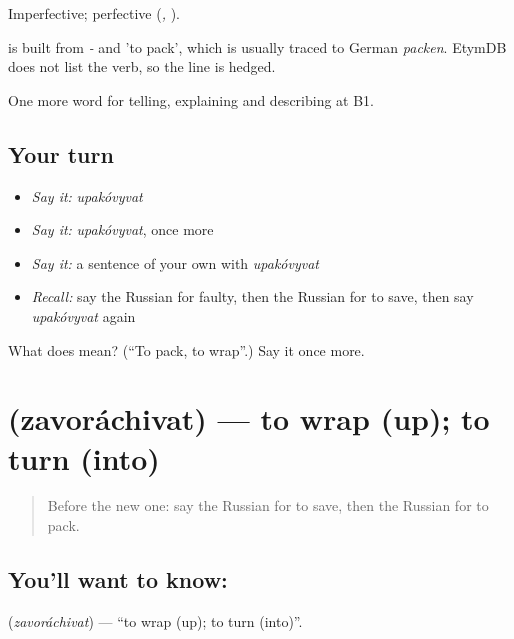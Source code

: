 Imperfective; perfective \emph{} (\emph{, }).

\begin{cousinweb}
\emph{} is built from \emph{-} and \emph{} 'to pack', which is usually traced to German \emph{packen}. EtymDB does not list the verb, so the line is hedged.
\end{cousinweb}

\begin{grammarlens}[title={What you've built}]
One more word for telling, explaining and describing at B1.
\end{grammarlens}

\subsection*{Your turn}
\begin{itemize}
\raggedright
  \item \emph{Say it:} \emph{upakóvyvat}
  \item \emph{Say it:} \emph{upakóvyvat}, once more
  \item \emph{Say it:} a sentence of your own with \emph{upakóvyvat}
  \item \emph{Recall:} say the Russian for faulty, then the Russian for to save, then say \emph{upakóvyvat} again
\end{itemize}

\begin{tcolorbox}[breakable,colback=teal!4,colframe=teal!35!black,title={Before you move on}]
What does  mean? (\textquotedblleft{}To pack, to wrap\textquotedblright{}.) Say it once more.
\end{tcolorbox}
\section[\texorpdfstring{\ru{заворачивать} (zavoráchivat)}{заворачивать (zavoráchivat)}]{ (zavoráchivat) — to wrap (up); to turn (into)}

\label{lesson:RU-C457-zavorachivat}



\begin{quote}
Before the new one: say the Russian for to save, then the Russian for to pack.
\end{quote}

\subsection*{You'll want to know: }
\textbf{} (\emph{zavoráchivat}) — \textquotedblleft{}to wrap (up); to turn (into)\textquotedblright{}.

